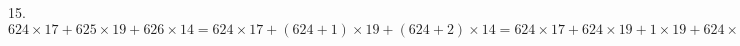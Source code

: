 15. $624\times17+625\times 19+626\times14=624\times17+(624+1)\times19+(624+2)\times14=624\times17+624\times19+1\times19+624\times14+2\times14=
624\times(17+19+14)+19+28=624\times50+47=31200+47=31247.$\\
